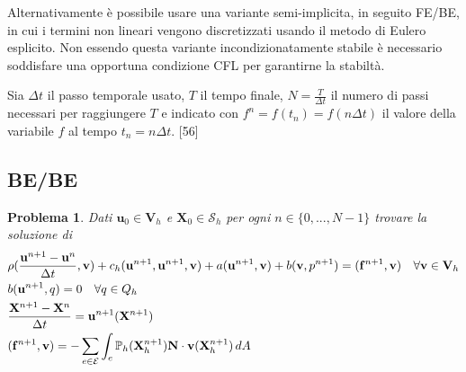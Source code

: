 \documentclass{book}
\newtheorem{problem}[theorem]{Problema}
\begin{document}
Alternativamente è possibile usare una variante semi-implicita, in seguito FE/BE, in cui i termini non lineari vengono discretizzati usando il metodo di Eulero esplicito. Non essendo questa variante incondizionatamente stabile è necessario soddisfare una opportuna condizione CFL per garantirne la stabiltà.

Sia $\Delta t$ il passo temporale usato, $T$ il tempo finale, $N=\frac{T}{\Delta t}$ il numero di passi necessari per raggiungere $T$ e indicato con $f^n = f(t_n) = f(n\Delta t)$ il valore della variabile $f$ al tempo $t_n=n\Delta t$. [56]

\subsection{BE/BE}

\begin{problem}
Dati $\mathbf{u}_0\in\mathbf{V}_h$ e  $\mathbf{X}_0\in\mathcal{S}_h$ per ogni $n\in\{0,...,N-1\}$ trovare la soluzione di
\begin{equation}
\begin{aligned}
&\rho(\frac{\mathbf{u}^{n+1}-\mathbf{u}^{n}}{\Delta t}, \mathbf{v}) + c_h(\mathbf{u}^{n+1},\mathbf{u}^{n+1},\mathbf{v}) + a(\mathbf{u}^{n+1},\mathbf{v}) + b(\mathbf{v},p^{n+1}) = \ps{\mathbf{f}^{n+1}}{\mathbf{v}} \quad \forall\mathbf{v}\in\mathbf{V}_h\\
&b(\mathbf{u}^{n+1},q)=0 \quad \forall q\in Q_h\\
&\frac{\mathbf{X}^{n+1}-\mathbf{X}^{n}}{\Delta t} = \mathbf{u}^{n+1}(\mathbf{X}^{n+1})\\
&\ps{\mathbf{f}^{n+1}}{\mathbf{v}}=-\sum_{e\in\mathcal{E}}\int_e\mathbb{P}_h(\mathbf{X}_h^{n+1})\mathbf{N}\cdot\mathbf{v}(\mathbf{X}^{n+1}_h)\,dA\\
\end{aligned}
\end{equation}
\end{problem}
\end{document}
